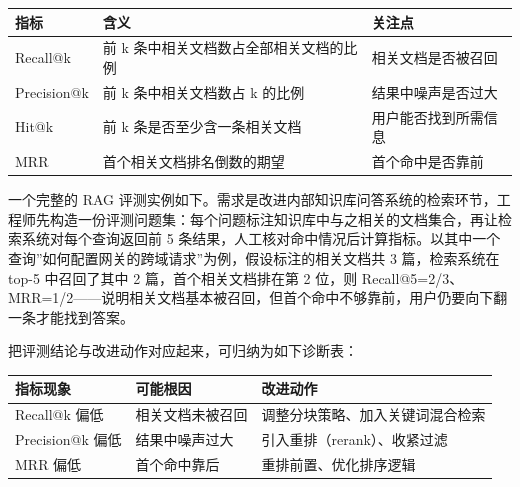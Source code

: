 \documentclass[
]{ctexbook}
\newcounter{none}
\begin{document}
{\def\LTcaptype{none} %
\begin{longtable}[]{@{}
  >{\raggedright\arraybackslash}p{}
  >{\raggedright\arraybackslash}p{}
  >{\raggedright\arraybackslash}p{}@{}}
\toprule\noalign{}
\begin{minipage}[b]{\linewidth}\raggedright
指标
\end{minipage} & \begin{minipage}[b]{\linewidth}\raggedright
含义
\end{minipage} & \begin{minipage}[b]{\linewidth}\raggedright
关注点
\end{minipage} \\
\midrule\noalign{}
\endhead
\bottomrule\noalign{}
\endlastfoot
Recall@k & 前 k 条中相关文档数占全部相关文档的比例 &
相关文档是否被召回 \\
Precision@k & 前 k 条中相关文档数占 k 的比例 & 结果中噪声是否过大 \\
Hit@k & 前 k 条是否至少含一条相关文档 & 用户能否找到所需信息 \\
MRR & 首个相关文档排名倒数的期望 & 首个命中是否靠前 \\
\end{longtable}
}

一个完整的 RAG
评测实例如下。需求是改进内部知识库问答系统的检索环节，工程师先构造一份评测问题集：每个问题标注知识库中与之相关的文档集合，再让检索系统对每个查询返回前
5
条结果，人工核对命中情况后计算指标。以其中一个查询''如何配置网关的跨域请求''为例，假设标注的相关文档共
3 篇，检索系统在 top-5 中召回了其中 2 篇，首个相关文档排在第 2 位，则
Recall@5=2/3、MRR=1/2------说明相关文档基本被召回，但首个命中不够靠前，用户仍要向下翻一条才能找到答案。

把评测结论与改进动作对应起来，可归纳为如下诊断表：

{\def\LTcaptype{none} %
\begin{longtable}[]{@{}lll@{}}
\toprule\noalign{}
指标现象 & 可能根因 & 改进动作 \\
\midrule\noalign{}
\endhead
\bottomrule\noalign{}
\endlastfoot
Recall@k 偏低 & 相关文档未被召回 & 调整分块策略、加入关键词混合检索 \\
Precision@k 偏低 & 结果中噪声过大 & 引入重排（rerank）、收紧过滤 \\
MRR 偏低 & 首个命中靠后 & 重排前置、优化排序逻辑 \\
\end{longtable}
}
\end{document}
